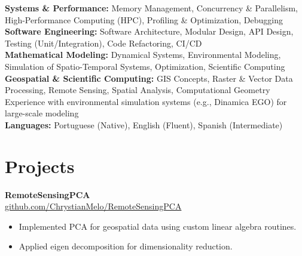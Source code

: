 \documentclass[10pt]{article}
\begin{document}
\noindent\textbf{Systems \& Performance:} 
Memory Management, Concurrency \& Parallelism, High-Performance Computing (HPC), Profiling \& Optimization, Debugging \\

\noindent\textbf{Software Engineering:} 
Software Architecture, Modular Design, API Design, Testing (Unit/Integration), Code Refactoring, CI/CD \\

\noindent\textbf{Mathematical Modeling:} 
Dynamical Systems, Environmental Modeling, Simulation of Spatio-Temporal Systems, Optimization, Scientific Computing \\

\noindent\textbf{Geospatial \& Scientific Computing:} 
GIS Concepts, Raster \& Vector Data Processing, Remote Sensing, Spatial Analysis, Computational Geometry \\
Experience with environmental simulation systems (e.g., Dinamica EGO) for large-scale modeling \\




\noindent\textbf{Languages:} 
Portuguese (Native), English (Fluent), Spanish (Intermediate)

\section*{Projects}

\noindent\textbf{RemoteSensingPCA} \\
\href{https://github.com/ChrystianMelo/RemoteSensingPCA}{github.com/ChrystianMelo/RemoteSensingPCA}
\begin{itemize}
    \item Implemented PCA for geospatial data using custom linear algebra routines.
    \item Applied eigen decomposition for dimensionality reduction.
\end{itemize}
\end{document}
